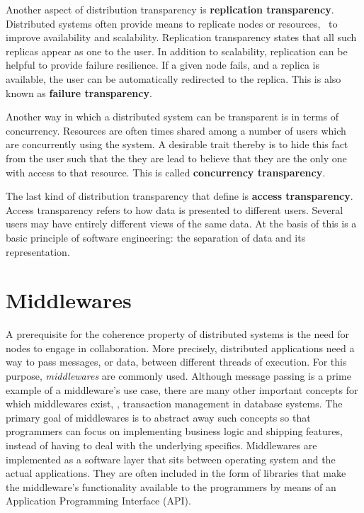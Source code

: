 Another aspect of distribution transparency is \textbf{replication transparency}. Distributed systems often provide means to replicate nodes or resources, \eg\ to improve availability and scalability. Replication transparency states that all such replicas appear as one to the user. In addition to scalability, replication can be helpful to provide failure resilience. If a given node fails, and a replica is available, the user can be automatically redirected to the replica. This is also known as \textbf{failure transparency}.

Another way in which a distributed system can be transparent is in terms of concurrency. Resources are often times shared among a number of users which are concurrently using the system. A desirable trait thereby is to hide this fact from the user such that the they are lead to believe that they are the only one with access to that resource. This is called \textbf{concurrency transparency}.

The last kind of distribution transparency that \citeauthor*{tanenbaum2017distributed} define is \textbf{access transparency}. Access transparency refers to how data is presented to different users. Several users may have entirely different views of the same data. At the basis of this is a basic principle of software engineering: the separation of data and its representation.

%
%
%
%
%
%
%
%
%
%

\section{Middlewares} \label{sec:middlewares}
A prerequisite for the coherence property of distributed systems is the need for nodes to engage in collaboration. More precisely, distributed applications need a way to pass messages, or data, between different threads of execution. For this purpose, \emph{middlewares} \cite{bernstein1996middleware} are commonly used. Although message passing is a prime example of a middleware's use case, there are many other important concepts for which middlewares exist, \eg , transaction management in database systems. The primary goal of middlewares is to abstract away such concepts so that programmers can focus on implementing business logic and shipping features, instead of having to deal with the underlying specifics. Middlewares are implemented as a software layer that sits between operating system and the actual applications. They are often included in the form of libraries that make the middleware's functionality available to the programmers by means of an Application Programming Interface (API). 

